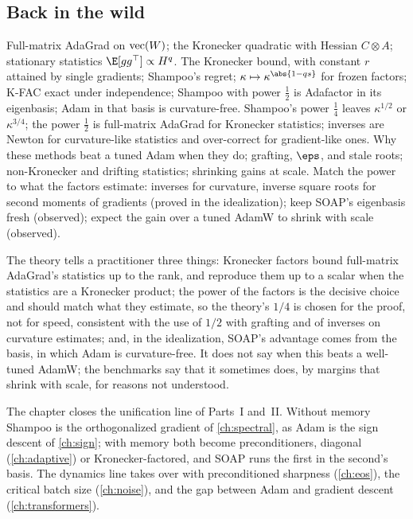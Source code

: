 \begin{refsection}
\section{Back in the wild}\label{sec:kronecker:back}

{Full-matrix AdaGrad on $\operatorname{vec}(W)$; the Kronecker quadratic with Hessian $C\otimes A$; stationary statistics $\E[gg^\top]\propto H^q$.}
{The Kronecker bound, with constant $r$ attained by single gradients; Shampoo's regret; $\kappa\mapsto\kappa^{\abs{1-qs}}$ for frozen factors; K-FAC exact under independence; Shampoo with power $\frac12$ is Adafactor in its eigenbasis; Adam in that basis is curvature-free.}
{Shampoo's power $\frac14$ leaves $\kappa^{1/2}$ or $\kappa^{3/4}$; the power $\frac12$ is full-matrix AdaGrad for Kronecker statistics; inverses are Newton for curvature-like statistics and over-correct for gradient-like ones.}
{Why these methods beat a tuned Adam when they do; grafting, $\eps$, and stale roots; non-Kronecker and drifting statistics; shrinking gains at scale.}
{Match the power to what the factors estimate: inverses for curvature, inverse square roots for second moments of gradients (proved in the idealization); keep SOAP's eigenbasis fresh (observed); expect the gain over a tuned AdamW to shrink with scale (observed).}

The theory tells a practitioner three things: Kronecker factors bound full-matrix AdaGrad's statistics up to the rank, and reproduce them up to a scalar when the statistics are a Kronecker product; the power of the factors is the decisive choice and should match what they estimate, so the theory's $1/4$ is chosen for the proof, not for speed, consistent with the use of $1/2$ with grafting and of inverses on curvature estimates; and, in the idealization, SOAP's advantage comes from the basis, in which Adam is curvature-free. It does not say when this beats a well-tuned AdamW; the benchmarks say that it sometimes does, by margins that shrink with scale, for reasons not understood.

The chapter closes the unification line of Parts~I and~II. Without memory Shampoo is the orthogonalized gradient of \cref{ch:spectral}, as Adam is the sign descent of \cref{ch:sign}; with memory both become preconditioners, diagonal (\cref{ch:adaptive}) or Kronecker-factored, and SOAP runs the first in the second's basis. The dynamics line takes over with preconditioned sharpness (\cref{ch:eos}), the critical batch size (\cref{ch:noise}), and the gap between Adam and gradient descent (\cref{ch:transformers}).


\end{refsection}
